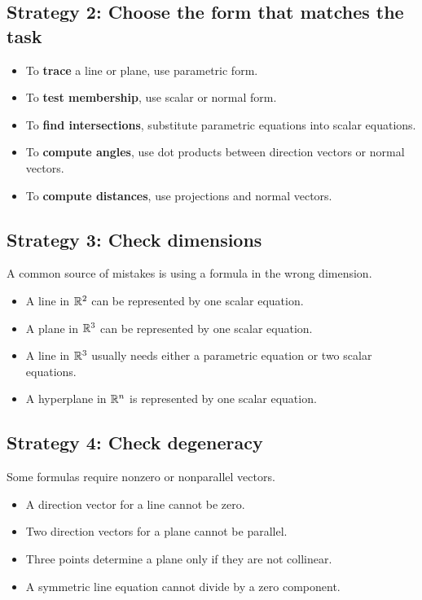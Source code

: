 \subsection*{Strategy 2: Choose the form that matches the task}
\begin{itemize}
\item To \textbf{trace} a line or plane, use parametric form.
\item To \textbf{test membership}, use scalar or normal form.
\item To \textbf{find intersections}, substitute parametric equations into scalar equations.
\item To \textbf{compute angles}, use dot products between direction vectors or normal vectors.
\item To \textbf{compute distances}, use projections and normal vectors.
\end{itemize}

\subsection*{Strategy 3: Check dimensions}

A common source of mistakes is using a formula in the wrong dimension.
\begin{itemize}
\item A line in $\mathbb{R}^2$ can be represented by one scalar equation.
\item A plane in $\mathbb{R}^3$ can be represented by one scalar equation.
\item A line in $\mathbb{R}^3$ usually needs either a parametric equation or two scalar equations.
\item A hyperplane in $\mathbb{R}^n$ is represented by one scalar equation.
\end{itemize}

\subsection*{Strategy 4: Check degeneracy}

Some formulas require nonzero or nonparallel vectors.
\begin{itemize}
\item A direction vector for a line cannot be zero.
\item Two direction vectors for a plane cannot be parallel.
\item Three points determine a plane only if they are not collinear.
\item A symmetric line equation cannot divide by a zero component.
\end{itemize}

